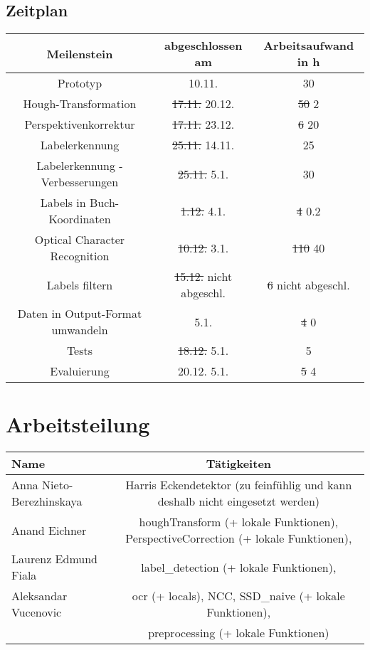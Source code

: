\documentclass[paper=A4, deutsch]{scrartcl}
\begin{document}
\subsection{Zeitplan}
\begin{table}[H]
	\centering
		\begin{tabular}{|c|c|c|}
		\hline
		Meilenstein & abgeschlossen am & Arbeitsaufwand in h\\
		\hline
		Prototyp & 10.11. & 30\\
		\hline
		Hough-Transformation & \st{17.11.} 20.12. & \st{50} 2\\
		\hline
		Perspektivenkorrektur & \st{17.11.} 23.12. & \st{6} 20\\
		\hline
		Labelerkennung & \st{25.11.} 14.11. & 25\\
		\hline
		Labelerkennung - Verbesserungen & \st{25.11.} 5.1. & 30\\
		\hline
		Labels in Buch-Koordinaten & \st{1.12.} 4.1. & \st{4} 0.2\\
		\hline
		Optical Character Recognition & \st{10.12.} 3.1. & \st{110} 40\\
		\hline
		Labels filtern & \st{15.12.} nicht abgeschl. & \st{6} nicht abgeschl.\\
		\hline
		Daten in Output-Format umwandeln & 5.1. & \st{4} 0\\
		\hline
		Tests & \st{18.12.} 5.1. & 5\\
		\hline
		Evaluierung & {20.12.} 5.1. & \st{5} 4 \\
		\hline
		\end{tabular}
\end{table}

\section{Arbeitsteilung}
\begin{center}
  \begin{tabular}{ |l | c | }
    \hline
  Name & Tätigkeiten\\
    \hline
    	Anna Nieto-Berezhinskaya & Harris Eckendetektor (zu feinfühlig und kann deshalb nicht eingesetzt werden)\\
		\hline
		Anand Eichner & houghTransform (+ lokale Funktionen), PerspectiveCorrection (+ lokale Funktionen),\\
		\hline
		Laurenz Edmund Fiala & label\_detection (+ lokale Funktionen),\\
		\hline
		Aleksandar Vucenovic & ocr (+ locals), NCC, SSD\_naive (+ lokale Funktionen),\\
		 & preprocessing (+ lokale Funktionen)\\
		\hline
  \end{tabular}
\end{center}
\end{document}
